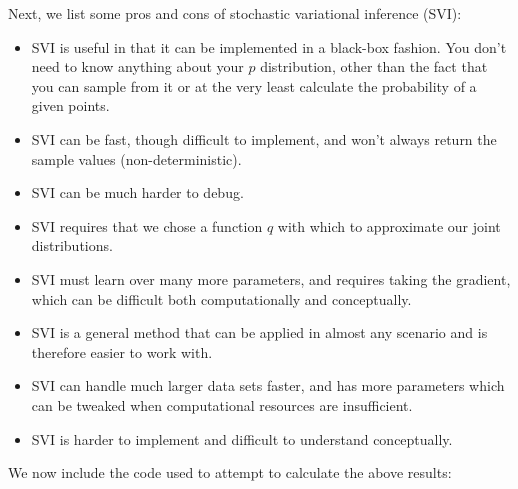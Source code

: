\documentclass{harvardml}
\theoremstyle{plain}
\begin{document}
\begin{enumerate}
Next, we list some pros and cons of stochastic variational inference (SVI):
\begin{itemize}
\item SVI is useful in that it can be implemented in a black-box fashion. You don't need to know anything about your $p$ distribution, other than the fact that you can sample from it or at the very least calculate the probability of a given points.
\item SVI can be fast, though difficult to implement, and won't always return the sample values (non-deterministic).
\item SVI can be much harder to debug.
\item SVI requires that we chose a function $q$ with which to approximate our joint distributions.
\item SVI must learn over many more parameters, and requires taking the gradient, which can be difficult both computationally and conceptually.
\item SVI is a general method that can be applied in almost any scenario and is therefore easier to work with.
\item SVI can handle much larger data sets faster, and has more parameters which can be tweaked when computational resources are insufficient.
\item SVI is harder to implement and difficult to understand conceptually.
\end{itemize}
\end{enumerate}


We now include the code used to attempt to calculate the above results:




\end{document}
